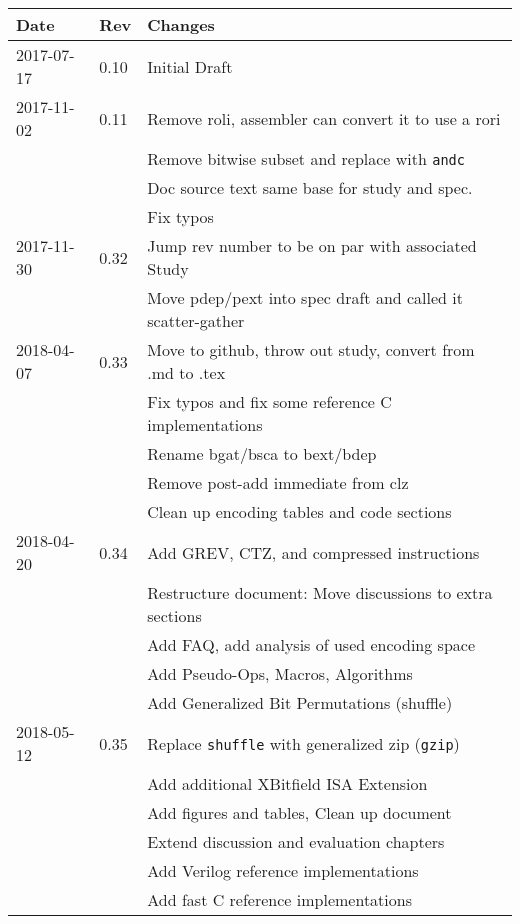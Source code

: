 \documentclass[twoside,11pt]{book}
\begin{document}
\begin{center}
\begin{tabular}{lll}
Date & Rev & Changes \\
\hline
2017-07-17 & 0.10 & Initial Draft \\
\hline
2017-11-02 & 0.11 & Remove roli, assembler can convert it to use a rori \\
           &      & Remove bitwise subset and replace with \texttt{andc} \\
           &      & Doc source text same base for study and spec. \\
           &      & Fix typos \\
\hline
2017-11-30 & 0.32 & Jump rev number to be on par with associated Study \\
           &      & Move pdep/pext into spec draft and called it scatter-gather \\
\hline
2018-04-07 & 0.33 & Move to github, throw out study, convert from .md to .tex \\
           &      & Fix typos and fix some reference C implementations \\
           &      & Rename bgat/bsca to bext/bdep \\
           &      & Remove post-add immediate from clz \\
           &      & Clean up encoding tables and code sections \\
\hline
2018-04-20 & 0.34 & Add GREV, CTZ, and compressed instructions \\
           &      & Restructure document: Move discussions to extra sections \\
           &      & Add FAQ, add analysis of used encoding space \\
           &      & Add Pseudo-Ops, Macros, Algorithms \\
           &      & Add Generalized Bit Permutations (shuffle) \\
\hline
2018-05-12 & 0.35 & Replace {\tt shuffle} with generalized zip ({\tt gzip}) \\
           &      & Add additional XBitfield ISA Extension \\
           &      & Add figures and tables, Clean up document \\
           &      & Extend discussion and evaluation chapters \\
           &      & Add Verilog reference implementations \\
           &      & Add fast C reference implementations \\
\hline
\end{tabular}
\end{center}
\end{document}
